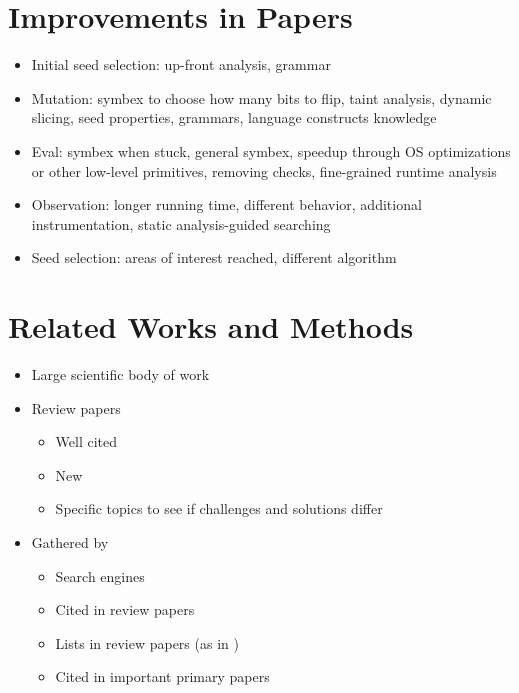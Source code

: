 \documentclass{article}
\begin{document}
\begin{multicols}{2}
    \section{Improvements in Papers}
    \begin{itemize}
        \item Initial seed selection: up-front analysis\cite{Skyfire, Orthrus, DIFUZE}, grammar\cite{QuickFuzz, QuickFuzz2}
        \item Mutation: symbex to choose how many bits to flip\cite{SYMFUZZ}, taint analysis\cite{Mayhem, Angora, Steelix, VUzzer}, dynamic slicing\cite{MutaGen}, seed properties\cite{SDF}, grammars\cite{SCADA, IMF}, language constructs knowledge\cite{Chizpurfle}
        \item Eval: symbex when stuck\cite{Driller, Mayhem}, general symbex\cite{S2F}, speedup through OS optimizations\cite{OS} or other low-level primitives\cite{IMF, VDF, kAFL}, removing checks\cite{TFuzz}, fine-grained runtime analysis\cite{MEDS}
        \item Observation: longer running time\cite{SlowFuzz}, different behavior\cite{NEZHA}, additional instrumentation\cite{Steelix, Angora}, static analysis-guided searching\cite{Dowser, VUzzer}
        \item Seed selection: areas of interest reached\cite{AFLGo, CGF, FairFuzz, VUzzer}, different algorithm\cite{SeedSelection, Scheduling}
    \end{itemize}

    \section{Related Works and Methods}
    \begin{itemize}
        \item Large scientific body of work
        \item Review papers
              \begin{itemize}
                  \item Well cited
                  \item New
                  \item Specific topics to see if challenges and solutions differ
              \end{itemize}
        \item Gathered by
              \begin{itemize}
                  \item Search engines
                  \item Cited in review papers
                  \item Lists in review papers (as in \cite{Demystifying})
                  \item Cited in important primary papers
              \end{itemize}
    \end{itemize}


\end{multicols}
\end{document}

